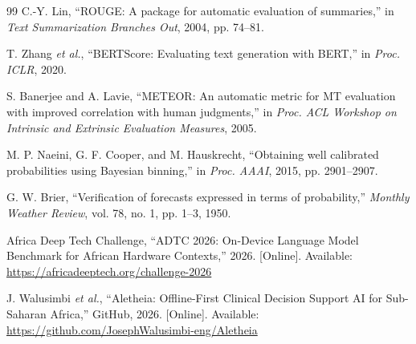 \documentclass[journal]{IEEEtran}
\begin{document}
\begin{thebibliography}{99}
C.-Y. Lin,
``ROUGE: A package for automatic evaluation of summaries,''
in \textit{Text Summarization Branches Out}, 2004, pp. 74--81.

T. Zhang \textit{et al.},
``BERTScore: Evaluating text generation with BERT,''
in \textit{Proc. ICLR}, 2020.

S. Banerjee and A. Lavie,
``METEOR: An automatic metric for MT evaluation with improved correlation with human judgments,''
in \textit{Proc. ACL Workshop on Intrinsic and Extrinsic Evaluation Measures}, 2005.

M. P. Naeini, G. F. Cooper, and M. Hauskrecht,
``Obtaining well calibrated probabilities using Bayesian binning,''
in \textit{Proc. AAAI}, 2015, pp. 2901--2907.

G. W. Brier,
``Verification of forecasts expressed in terms of probability,''
\textit{Monthly Weather Review}, vol. 78, no. 1, pp. 1--3, 1950.

Africa Deep Tech Challenge, ``ADTC 2026: On-Device Language Model
Benchmark for African Hardware Contexts,'' 2026.
[Online]. Available: \url{https://africadeeptech.org/challenge-2026}

J. Walusimbi \textit{et al.},
``Aletheia: Offline-First Clinical Decision Support AI
for Sub-Saharan Africa,''
GitHub, 2026. [Online]. Available:
\url{https://github.com/JosephWalusimbi-eng/Aletheia} 

\end{thebibliography}
\end{document}
